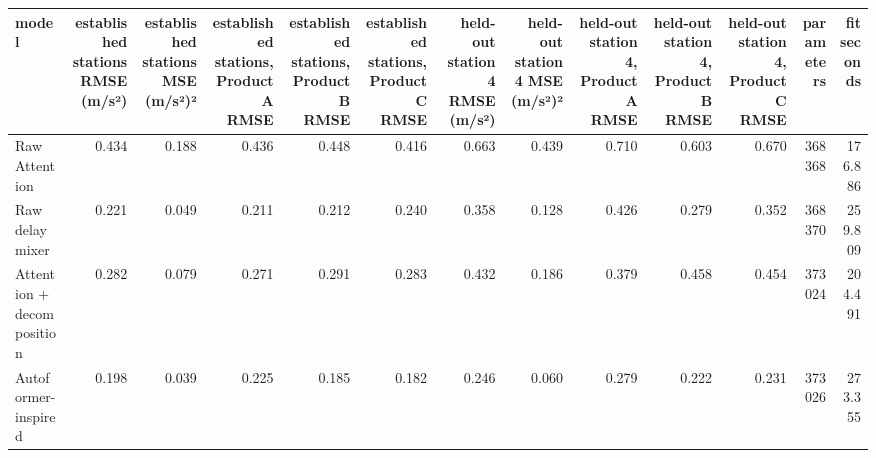 \begin{tabular}{lrrrrrrrrrrrr}
\toprule
model & established stations RMSE (m/s²) & established stations MSE (m/s²)² & established stations, Product A RMSE & established stations, Product B RMSE & established stations, Product C RMSE & held-out station 4 RMSE (m/s²) & held-out station 4 MSE (m/s²)² & held-out station 4, Product A RMSE & held-out station 4, Product B RMSE & held-out station 4, Product C RMSE & parameters & fit seconds \\
\midrule
Raw Attention & 0.434 & 0.188 & 0.436 & 0.448 & 0.416 & 0.663 & 0.439 & 0.710 & 0.603 & 0.670 & 368368 & 176.886 \\
Raw delay mixer & 0.221 & 0.049 & 0.211 & 0.212 & 0.240 & 0.358 & 0.128 & 0.426 & 0.279 & 0.352 & 368370 & 259.809 \\
Attention + decomposition & 0.282 & 0.079 & 0.271 & 0.291 & 0.283 & 0.432 & 0.186 & 0.379 & 0.458 & 0.454 & 373024 & 204.491 \\
Autoformer-inspired & 0.198 & 0.039 & 0.225 & 0.185 & 0.182 & 0.246 & 0.060 & 0.279 & 0.222 & 0.231 & 373026 & 273.355 \\
\bottomrule
\end{tabular}
